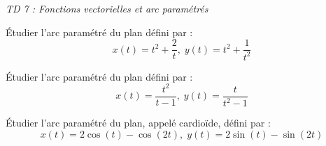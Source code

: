 \documentclass[a4paper,10pt]{report}
\begin{document}
\everymath{\displaystyle}


\begin{center}
\textit{{ {\huge TD 7 : Fonctions vectorielles et arc paramétrés}}}
\end{center}


\medskip

%

%
%
%
%
%
%
%
%
%
%

\begin{Exa} Étudier l'arc paramétré du plan défini par :
$$ x(t) = t^2+ \dfrac{2}{t}, \; y(t) = t^2+\dfrac{1}{t^2} $$
\end{Exa}

\begin{Exa} Étudier l'arc paramétré du plan défini par :
$$ x(t) = \dfrac{t^2}{t-1}, \; y(t) = \dfrac{t}{t^2-1} $$
\end{Exa}

\begin{Exa} Étudier l'arc paramétré du plan, appelé cardioïde,  défini par :
$$ x(t) = 2 \cos(t) - \cos(2t), \; y(t) = 2 \sin(t) - \sin(2t) $$
\end{Exa} 
\end{document}
